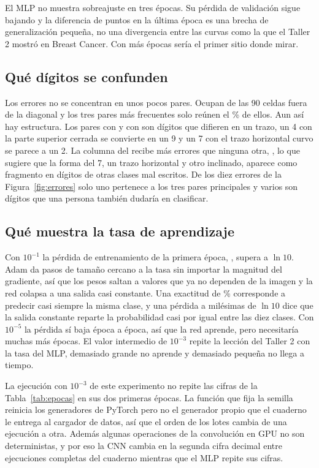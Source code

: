 \documentclass[11pt,letterpaper]{article}
\begin{document}
El MLP no muestra sobreajuste en tres épocas. Su pérdida de validación sigue bajando y la diferencia de \brechaMlpC{} puntos en la última época es una brecha de generalización pequeña, no una divergencia entre las curvas como la que el Taller 2 mostró en Breast Cancer. Con más épocas sería el primer sitio donde mirar.

\subsection{Qué dígitos se confunden}

Los errores no se concentran en unos pocos pares. Ocupan \celdasConError{} de las 90 celdas fuera de la diagonal y los tres pares más frecuentes solo reúnen el \tresParesPct{} \% de ellos. Aun así hay estructura. Los pares \parAA{} con \parAB{} y \parBA{} con \parBB{} son dígitos que difieren en un trazo, un 4 con la parte superior cerrada se convierte en un 9 y un 7 con el trazo horizontal curvo se parece a un 2. La columna del \colMaxDig{} recibe más errores que ninguna otra, \colMaxN{}, lo que sugiere que la forma del 7, un trazo horizontal y otro inclinado, aparece como fragmento en dígitos de otras clases mal escritos. De los diez errores de la Figura~\ref{fig:errores} solo uno pertenece a los tres pares principales y varios son dígitos que una persona también dudaría en clasificar.

\subsection{Qué muestra la tasa de aprendizaje}

Con $10^{-1}$ la pérdida de entrenamiento de la primera época, \lrATrLossA, supera a $\ln 10$. Adam da pasos de tamaño cercano a la tasa sin importar la magnitud del gradiente, así que los pesos saltan a valores que ya no dependen de la imagen y la red colapsa a una salida casi constante. Una exactitud de \lrAAcc{} \% corresponde a predecir casi siempre la misma clase, y una pérdida a \lrAMilesimas{} milésimas de $\ln 10$ dice que la salida constante reparte la probabilidad casi por igual entre las diez clases. Con $10^{-5}$ la pérdida sí baja época a época, así que la red aprende, pero necesitaría muchas más épocas. El valor intermedio de $10^{-3}$ repite la lección del Taller 2 con la tasa del MLP, demasiado grande no aprende y demasiado pequeña no llega a tiempo.

La ejecución con $10^{-3}$ de este experimento no repite las cifras de la Tabla~\ref{tab:epocas} en sus dos primeras épocas. La función que fija la semilla reinicia los generadores de PyTorch pero no el generador propio que el cuaderno le entrega al cargador de datos, así que el orden de los lotes cambia de una ejecución a otra. Además algunas operaciones de la convolución en GPU no son deterministas, y por eso la CNN cambia en la segunda cifra decimal entre ejecuciones completas del cuaderno mientras que el MLP repite sus cifras.
\end{document}
